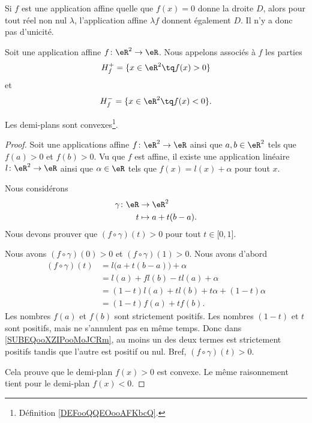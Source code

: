 Si \( f\) est une application affine quelle que \( f(x)=0\) donne la droite \( D\), alors pour tout réel non nul \( \lambda\), l'application affine \( \lambda f\)  donnent également \( D\). Il n'y a donc pas d'unicité.

\begin{definition}
	Soit une application affine \( f\colon \eR^2\to \eR\). Nous appelons  associés à \( f\) les parties
	\begin{equation}
		H_f^+=\{ x\in \eR^2\tq f(x)>0 \}
	\end{equation}
	et
	\begin{equation}
		H_f^-=\{ x\in \eR^2\tq f(x)<0 \}.
	\end{equation}
\end{definition}


\begin{lemma}        \label{LEMooEZEDooSDbrkq}
	Les demi-plans sont convexes\footnote{Définition \ref{DEFooQQEOooAFKbcQ}.}.
\end{lemma}

\begin{proof}
	Soit une applications affine \( f\colon \eR^2\to\eR\) ainsi que \( a,b\in \eR^2\) tels que \( f(a)>0\) et \( f(b)>0\). Vu que \( f\) est affine, il existe une application linéaire \( l\colon \eR^2\to \eR\) ainsi que \( \alpha\in \eR\) tels que \( f(x)=l(x)+\alpha\) pour tout \( x\).

	Nous considérons
	\begin{equation}
		\begin{aligned}
			\gamma\colon \eR & \to \eR^2         \\
			t                & \mapsto a+t(b-a).
		\end{aligned}
	\end{equation}
	Nous devons prouver que \( (f\circ\gamma)(t)>0\) pour tout \( t\in\mathopen[ 0 , 1 \mathclose]\).

	Nous avons \( (f\circ\gamma)(0)>0\) et \( (f\circ\gamma)(1)>0\). Nous avons d'abord
	\begin{subequations}
		\begin{align}
			(f\circ\gamma)(t) & =l\big( a+t(b-a) \big)+\alpha                      \\
			                  & =l(a)+fl(b)-tl(a)+\alpha                           \\
			                  & =(1-t)l(a)+tl(b)+t\alpha+(1-t)\alpha               \\
			                  & =(1-t)f(a)+tf(b).      \label{SUBEQooXZIPooMoJCRm}
		\end{align}
	\end{subequations}
	Les nombres \( f(a)\) et \( f(b)\) sont strictement positifs. Les nombres \( (1-t)\) et \( t\) sont positifs, mais ne s'annulent pas en même temps. Donc dans \eqref{SUBEQooXZIPooMoJCRm}, au moins un des deux termes est strictement positifs tandis que l'autre est positif ou nul. Bref, \( (f\circ\gamma)(t)>0\).

	Cela prouve que le demi-plan \( f(x)>0\) est convexe. Le même raisonnement tient pour le demi-plan \( f(x)<0\).
\end{proof}

